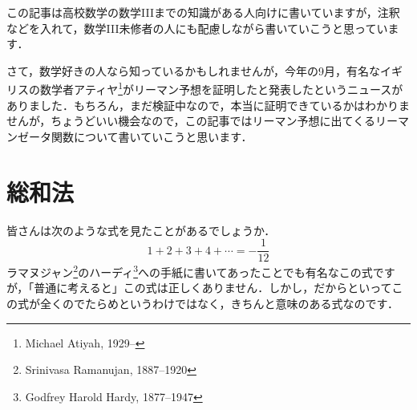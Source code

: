\documentclass[./main]{subfile}
\begin{document}


この記事は高校数学の数学IIIまでの知識がある人向けに書いていますが，注釈などを入れて，数学III未修者の人にも配慮しながら書いていこうと思っています．

さて，数学好きの人なら知っているかもしれませんが，今年の9月，有名なイギリスの数学者アティヤ\footnote{Michael Atiyah, 1929--}がリーマン予想を証明したと発表したというニュースがありました．もちろん，まだ検証中なので，本当に証明できているかはわかりませんが，ちょうどいい機会なので，この記事ではリーマン予想に出てくるリーマンゼータ関数について書いていこうと思います．

\section{総和法}

皆さんは次のような式を見たことがあるでしょうか．
\begin{equation}\label{zeta-1}
1+2+3+4+\cdots=-\frac{1}{12}
\end{equation}
ラマヌジャン\footnote{Srinivasa Ramanujan, 1887--1920}のハーディ\footnote{Godfrey Harold Hardy, 1877--1947}への手紙に書いてあったことでも有名なこの式ですが，「普通に考えると」この式は正しくありません．しかし，だからといってこの式が全くのでたらめというわけではなく，きちんと意味のある式なのです．
\end{document}
